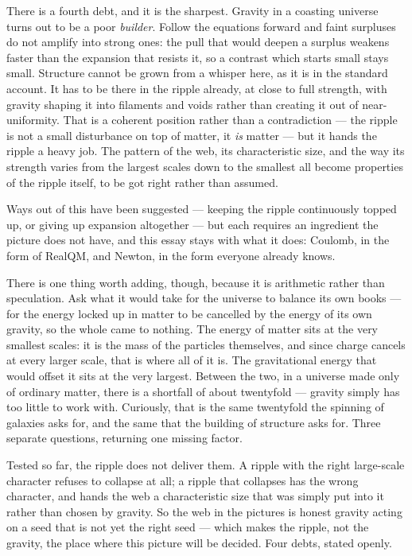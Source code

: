 \documentclass[11pt]{article}
\begin{document}
There is a fourth debt, and it is the sharpest. Gravity in a coasting universe turns out to be a poor
\emph{builder}. Follow the equations forward and faint surpluses do not amplify into strong ones: the pull that
would deepen a surplus weakens faster than the expansion that resists it, so a contrast which starts small stays
small. Structure cannot be grown from a whisper here, as it is in the standard account. It has to be there in the
ripple already, at close to full strength, with gravity shaping it into filaments and voids rather than creating
it out of near-uniformity. That is a coherent position rather than a contradiction --- the ripple is not a small
disturbance on top of matter, it \emph{is} matter --- but it hands the ripple a heavy job. The pattern of the web,
its characteristic size, and the way its strength varies from the largest scales down to the smallest all become
properties of the ripple itself, to be got right rather than assumed.

Ways out of this have been suggested --- keeping the ripple continuously topped up, or giving up expansion
altogether --- but each requires an ingredient the picture does not have, and this essay stays with what it does:
Coulomb, in the form of RealQM, and Newton, in the form everyone already knows.

There is one thing worth adding, though, because it is arithmetic rather than speculation. Ask what it would take
for the universe to balance its own books --- for the energy locked up in matter to be cancelled by the energy of
its own gravity, so the whole came to nothing. The energy of matter sits at the very smallest scales: it is the
mass of the particles themselves, and since charge cancels at every larger scale, that is where all of it is. The
gravitational energy that would offset it sits at the very largest. Between the two, in a universe made only of
ordinary matter, there is a shortfall of about twentyfold --- gravity simply has too little to work with.
Curiously, that is the same twentyfold the spinning of galaxies asks for, and the same that the building of
structure asks for. Three separate questions, returning one missing factor.

Tested so far, the ripple does not deliver them. A ripple with the right large-scale character refuses to collapse at all;
a ripple that collapses has the wrong character, and hands the web a characteristic size that was simply put into
it rather than chosen by gravity. So the web in the pictures is honest gravity acting on a seed that is not yet
the right seed --- which makes the ripple, not the gravity, the place where this picture will be decided. Four
debts, stated openly.
\end{document}
